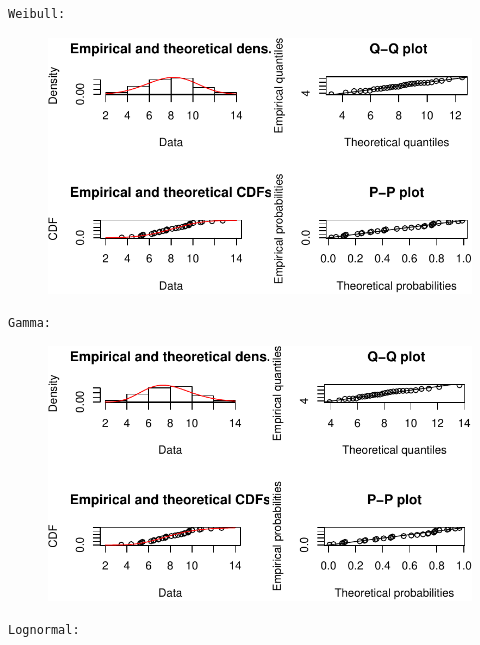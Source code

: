 \documentclass[
  letterpaper,
  DIV=11,
  numbers=noendperiod]{scrartcl}
\begin{document}
\begin{verbatim}
Weibull: 
\end{verbatim}

\begin{figure}[H]

{\centering \includegraphics{quiz5_files/figure-pdf/unnamed-chunk-37-2.pdf}

}

\end{figure}

\begin{verbatim}
Gamma: 
\end{verbatim}

\begin{figure}[H]

{\centering \includegraphics{quiz5_files/figure-pdf/unnamed-chunk-37-3.pdf}

}

\end{figure}

\begin{verbatim}
Lognormal: 
\end{verbatim}
\end{document}
